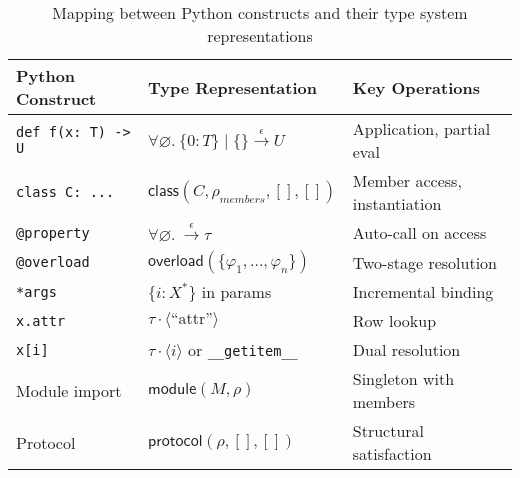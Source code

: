 \begin{table*}[h]
\centering
\begin{tabular}{|l|l|l|}
\hline
\textbf{Python Construct} & \textbf{Type Representation} & \textbf{Key Operations} \\
\hline
\texttt{def f(x: T) -> U} & $\forall\varnothing.\ \{0:T\} \mid \{\} \xrightarrow{\epsilon} U$ & Application, partial eval \\
\texttt{class C: ...} & $\mathsf{class}(C, \rho_{\mathit{members}}, [], [])$ & Member access, instantiation \\
\texttt{@property} & $\forall\varnothing.\ \xrightarrow{\epsilon} \tau$ & Auto-call on access \\
\texttt{@overload} & $\mathsf{overload}(\{\varphi_1, \ldots, \varphi_n\})$ & Two-stage resolution \\
\texttt{*args} & $\{i: X^*\}$ in params & Incremental binding \\
\texttt{x.attr} & $\tau \cdot \langle\text{``attr''}\rangle$ & Row lookup \\
\texttt{x[i]} & $\tau \cdot \langle i\rangle$ or \texttt{\_\_getitem\_\_} & Dual resolution \\
Module import & $\mathsf{module}(M, \rho)$ & Singleton with members \\
Protocol & $\mathsf{protocol}(\rho, [], [])$ & Structural satisfaction \\
\hline
\end{tabular}
\caption{Mapping between Python constructs and their type system representations}
\end{table*}
